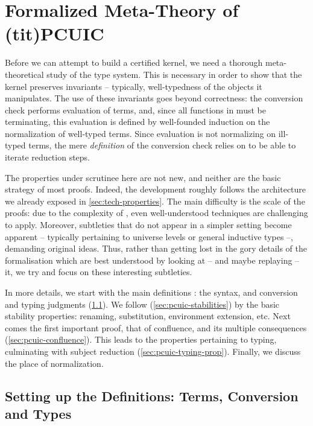 
\chapter{Formalized Meta-Theory of \kl(tit){PCUIC}}
\label{chap:metacoq-general}

\margintoc

Before we can attempt to build a certified kernel, we need a thorough meta-theoretical study
of the type system. This is necessary in order to show that the
kernel preserves invariants – typically, well-typedness of the objects it manipulates.
The use of these invariants goes beyond correctness:
the conversion check performs evaluation of terms, and, since all functions in 
must be terminating,
this evaluation is defined by well-founded induction on the normalization of well-typed terms.
Since evaluation is not normalizing on ill-typed terms, the mere \emph{definition} of the
conversion check relies on  to be able to iterate reduction steps.

The properties under scrutinee here are not new,
and neither are the basic strategy of most proofs.
Indeed, the development roughly follows the architecture we already exposed in
\cref{sec:tech-properties}. The main difficulty is the scale of the proofs: due to the
complexity of , even well-understood techniques are challenging to apply.
Moreover, subtleties that do not appear in a simpler setting become apparent –
typically pertaining to universe levels or general inductive types –,
demanding original ideas. Thus, rather than getting lost in
the gory details of the formalisation which are best understood by looking at
– and maybe replaying – it, we try and focus on these interesting subtleties.

In more details, we start with the main definitions : the syntax, and conversion and typing
judgments (\cref{sec:pcuic-defs}). We follow (\cref{sec:pcuic-stabilities}) by the basic
stability properties: renaming, substitution, environment extension, etc.
Next comes the first important proof, that of confluence, and its multiple consequences
(\cref{sec:pcuic-confluence}). This leads to the properties pertaining to typing, culminating
with subject reduction (\cref{sec:pcuic-typing-prop}).
Finally, we discuss the place of normalization.

\section[Terms, Conversion and Types]{Setting up the Definitions: Terms, Conversion and Types}
\label{sec:pcuic-defs}




